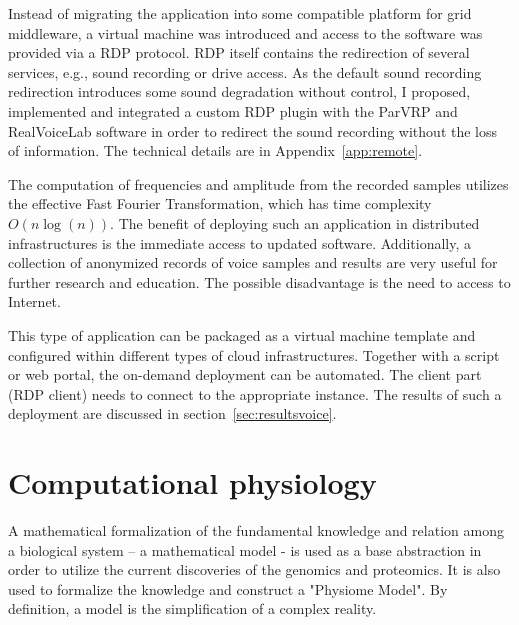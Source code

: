 Instead of migrating the application into some compatible platform for grid middleware, a virtual machine was introduced and access to the software was provided via a RDP protocol. RDP itself contains the redirection of several services, e.g., sound recording or drive access. As the default sound recording redirection introduces some sound degradation without control, I proposed, implemented and integrated a custom RDP plugin with the ParVRP and RealVoiceLab software in order to redirect the sound recording without the loss of information. The technical details are in Appendix~\ref{app:remote}. 

The computation of frequencies and amplitude from the recorded samples utilizes the effective Fast Fourier Transformation, which has time complexity $O(n\log(n))$. The benefit of deploying such an application in distributed infrastructures is the immediate access to updated software. Additionally, a collection of anonymized records of voice samples and results are very useful for further research and education. The possible disadvantage is the need to access to Internet.

This type of application can be packaged as a virtual machine template and configured within different types of cloud infrastructures. Together with a script or web portal, the on-demand deployment can be automated. The client part (RDP client) needs to connect to the appropriate instance. The results of such a deployment are discussed in section~\ref{sec:resultsvoice}.

\section{Computational physiology}
\label{sec:models}
A mathematical formalization of the fundamental knowledge and relation among a biological system – a mathematical model - is used as a base abstraction in order to utilize the current discoveries of the genomics and proteomics. It is also used to formalize the knowledge and construct a "Physiome Model". By  definition, a model is the simplification of a complex reality.

